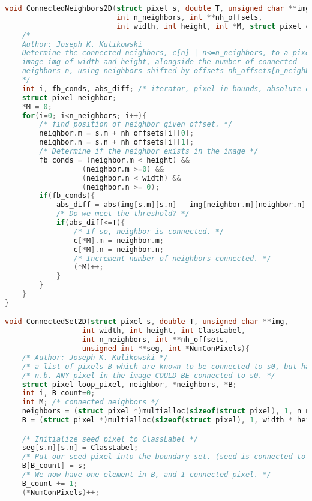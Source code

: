 \documentclass{article}
\begin{document}
\begin{lstlisting}[language=C, caption=connected\_neighbors\_sets.c, label={lst:connsets}]
void ConnectedNeighbors2D(struct pixel s, double T, unsigned char **img,
                          int n_neighbors, int **nh_offsets,
                          int width, int height, int *M, struct pixel c[]){
    /*
    Author: Joseph K. Kulikowski
    Determine the connected neighbors, c[n] | n<=n_neighbors, to a pixel p within an
    image img of width and height, alongside the number of connected
    neighbors n, using neighbors shifted by offsets nh_offsets[n_neighbors][2].
    */ 
    int i, fb_conds, abs_diff; /* iterator, pixel in bounds, absolute difference*/
    struct pixel neighbor;
    *M = 0;
    for(i=0; i<n_neighbors; i++){
        /* find position of neighbor given offset. */
        neighbor.m = s.m + nh_offsets[i][0];
        neighbor.n = s.n + nh_offsets[i][1];
        /* Determine if the neighbor exists in the image */
        fb_conds = (neighbor.m < height) &&
                  (neighbor.m >=0) &&
                  (neighbor.n < width) &&
                  (neighbor.n >= 0);
        if(fb_conds){
            abs_diff = abs(img[s.m][s.n] - img[neighbor.m][neighbor.n]);
            /* Do we meet the threshold? */
            if(abs_diff<=T){
                /* If so, neighbor is connected. */
                c[*M].m = neighbor.m;
                c[*M].n = neighbor.n;
                /* Increment number of neighbors connected. */
                (*M)++;
            }
        }
    }
}

void ConnectedSet2D(struct pixel s, double T, unsigned char **img,
                  int width, int height, int ClassLabel,
                  int n_neighbors, int **nh_offsets,
                  unsigned int **seg, int *NumConPixels){
    /* Author: Joseph K. Kulikowski */
    /* a list of pixels B which are known to be connected to s0, but have not yet been searched */
    /* n.b. ANY pixel in the image COULD BE connected to s0. */
    struct pixel loop_pixel, neighbor, *neighbors, *B;
    int i, B_count=0;
    int M; /* connected neighbors */
    neighbors = (struct pixel *)multialloc(sizeof(struct pixel), 1, n_neighbors);
    B = (struct pixel *)multialloc(sizeof(struct pixel), 1, width * height);

    /* Initialize seed pixel to ClassLabel */
    seg[s.m][s.n] = ClassLabel;
    /* Put our seed pixel into the boundary set. (seed is connected to itself.) */
    B[B_count] = s;
    /* We now have one element in B, and 1 connected pixel. */
    B_count += 1;
    (*NumConPixels)++;


\end{lstlisting}
\end{document}
